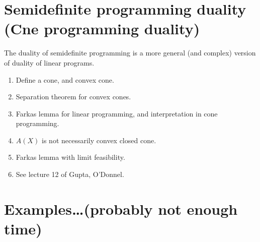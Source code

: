 \documentclass[a4paper,twoside,justified]{tufte-handout}
\begin{document}
\section{Semidefinite programming duality (Cne programming duality)}

The duality of semidefinite programming is a more general (and
complex) version of duality of linear programs.
\begin{enumerate}
\item Define a cone, and convex cone.
\item Separation theorem for convex cones.
\item Farkas lemma for linear programming, and interpretation in cone
programming.
\item $ A(X) $ is not necessarily convex closed cone.
\item Farkas lemma with limit feasibility.
\item See lecture 12 of Gupta, O'Donnel.
\end{enumerate}


\section{Examples\ldots (probably not enough time)}



\end{document}
